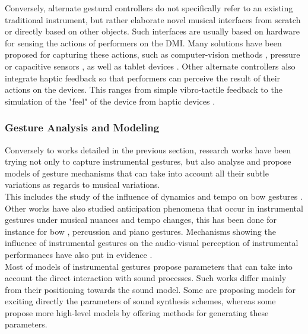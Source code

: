 {{Conversely, alternate gestural controllers do not specifically refer to an existing traditional instrument, but rather elaborate novel musical interfaces from scratch or directly based on other objects. Such interfaces are usually based on hardware for sensing the actions of performers on the DMI. Many solutions have been proposed for capturing these actions, such as computer-vision methods , pressure  or capacitive sensors , as well as tablet devices . Other alternate controllers also integrate haptic feedback so that performers can perceive the result of their actions on the devices. This ranges from simple vibro-tactile feedback  to the simulation of the "feel" of the device from haptic devices .


			\subsubsection{Gesture Analysis and Modeling}
			\label{subsubsec:CM_Control_GC_GAM}

Conversely to works detailed in the previous section, research works have been trying not only to capture instrumental gestures, but also analyse and propose models of gesture mechanisms that can take into account all their subtle variations as regards to musical variations.\\

This includes the study of the influence of dynamics and tempo on bow gestures . Other works have also studied anticipation phenomena that occur in instrumental gestures under musical nuances and tempo changes, this has been done for instance for bow , percussion  and piano  gestures. Mechanisms showing the influence of instrumental gestures on the audio-visual perception of instrumental performances have also put in evidence .\\


Most of models of instrumental gestures propose parameters that can take into account the direct interaction with sound processes. Such works differ mainly from their positioning towards the sound model. Some are proposing models for exciting directly the parameters of sound synthesis schemes, whereas some propose more high-level models by offering methods for generating these parameters.

}}
